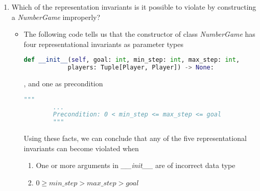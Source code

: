 \documentclass[12pt]{article}
\begin{document}
\begin{enumerate}[1.]
    \item Which of the representation invariants is it possible to violate by
    constructing a \textit{NumberGame} improperly?

    \begin{itemize}
        \item

        The following code tells us that the constructor of class \textit{NumberGame} has four
        representational invariants as parameter types

        \bigskip

        \begin{lstlisting}[language=Python]
        def __init__(self, goal: int, min_step: int, max_step: int,
            players: Tuple[Player, Player]) -> None:
        \end{lstlisting}

        \bigskip

        , and one as precondition

        \bigskip

        \begin{lstlisting}[language=Python]
        """
        ...
        Precondition: 0 < min_step <= max_step <= goal
        """
        \end{lstlisting}

        \bigskip

        Using these facts, we can conclude that any of the five
        representational invariants can become violated when

        \begin{enumerate}[1.]
            \item One or more arguments in \textit{\_\_init\_\_} are of incorrect data type
            \item $0 \geq \textit{min\_step} > \textit{max\_step} > \textit{goal}$
        \end{enumerate}








\end{itemize}
\end{enumerate}
\end{document}
